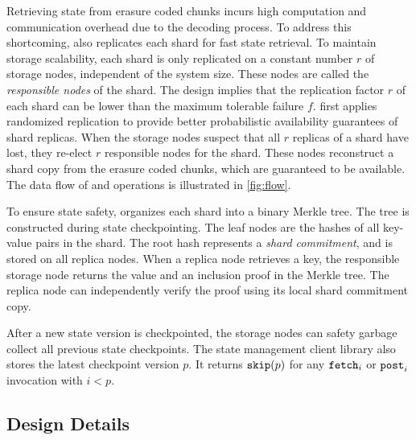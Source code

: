 Retrieving state from erasure coded chunks incurs high computation and communication overhead due to the decoding process.
To address this shortcoming, \sys also replicates each shard for fast state retrieval.
To maintain storage scalability, each shard is only replicated on a constant number $r$ of storage nodes, independent of the system size.
These nodes are called the \emph{responsible nodes} of the shard.
The design implies that the replication factor $r$ of each shard can be lower than the maximum tolerable failure $f$.
\sys first applies randomized replication to provide better probabilistic availability guarantees of shard replicas.
When the storage nodes suspect that all $r$ replicas of a shard have lost, they re-elect $r$ responsible nodes for the shard.
These nodes reconstruct a shard copy from the erasure coded chunks, which are guaranteed to be available.
The data flow of \fetch and \bump operations is illustrated in \cref{fig:flow}.

To ensure state safety, \sys organizes each shard into a binary Merkle tree.
The tree is constructed during state checkpointing.
The leaf nodes are the hashes of all key-value pairs in the shard.
The root hash represents a \emph{shard commitment}, and is stored on all replica nodes.
When a replica node retrieves a key, the responsible storage node returns the value and an inclusion proof in the Merkle tree.
The replica node can independently verify the proof using its local shard commitment copy.

After a new state version is checkpointed, the storage nodes can safety garbage collect all previous state checkpoints.
The state management client library also stores the latest checkpoint version $p$.
It returns $\texttt{skip}(p)$ for any $\texttt{fetch}_i$ or $\texttt{post}_i$ invocation with $i < p$.

\subsection{\sys Design Details}
\label{sec:design:details}


